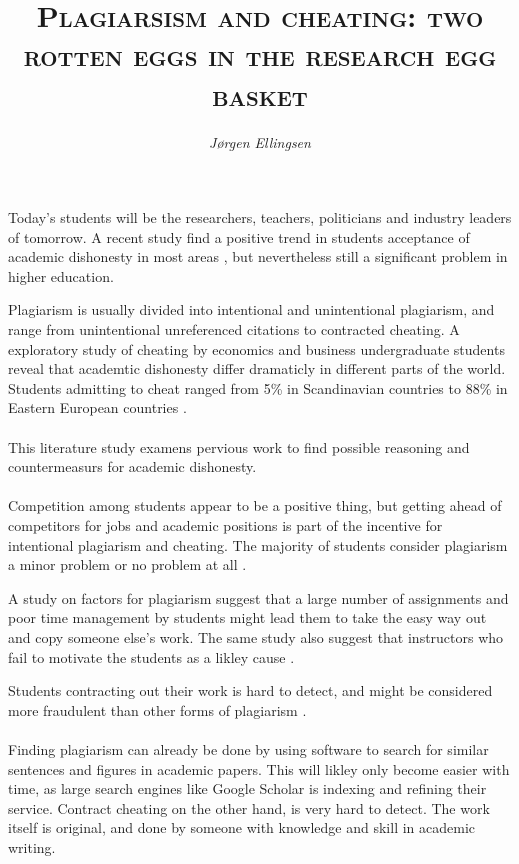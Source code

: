 \documentclass[10pt,a4paper]{article}
\author{\textit{Jørgen Ellingsen}}
\title{\textsc{Plagiarsism and cheating: two rotten eggs in the research egg basket}}
\begin{document}
\maketitle
\date{}

Today's students will be the researchers, teachers, politicians and industry leaders of tomorrow. A recent study find a positive trend in students acceptance of academic dishonesty in most areas \cite{Molnar2015}, but nevertheless still a significant problem in higher education. 

Plagiarism is usually divided into intentional and unintentional plagiarism, and range from unintentional unreferenced citations to contracted cheating. A exploratory study of cheating by economics and business undergraduate students reveal that academtic dishonesty differ dramaticly in different parts of the world. Students admitting to cheat ranged from 5\% in Scandinavian countries to 88\% in Eastern European countries \cite{Teixeira2010}.
\\ \\ %
This literature study examens pervious work to find possible reasoning and countermeasurs for academic dishonesty. 
\\ \\ %
Competition among students appear to be a positive thing, but getting ahead of competitors for jobs and academic positions is part of the incentive for intentional plagiarism and cheating. The majority of students consider plagiarism a minor problem or no problem at all \cite{Teixeira2010}.

A study on factors for plagiarism suggest that a large number of assignments and poor time management by students might lead them to take the easy way out and copy someone else's work. The same study also suggest that instructors who fail to motivate the students as a likley cause \cite{Comas2010}.

Students contracting out their work is hard to detect, and might be considered more fraudulent than other forms of plagiarism \cite{Walker2012}. 
\\ \\ %
Finding plagiarism can already be done by using software to search for similar sentences and figures in academic papers. This will likley only become easier with time, as large search engines like Google Scholar is indexing and refining their service. Contract cheating on the other hand, is very hard to detect. The work itself is original, and done by someone with knowledge and skill in academic writing. 
\end{document}
